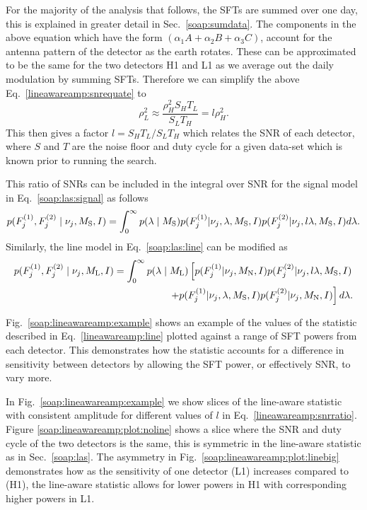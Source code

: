 For the majority of the analysis that follows, the \glspl{SFT} are summed over one day, this is explained in greater detail in Sec.~\ref{soap:sumdata}. 
The components in the above equation which have the form $(\alpha_1A +
\alpha_2B + \alpha_3C)$, account for the antenna pattern of the detector as the earth rotates.
These can be approximated to be the same for the two detectors H1 and L1 as we average out the daily modulation by summing \glspl{SFT}.
Therefore we can simplify the above Eq.~\ref{lineawareamp:snrequate} to
\begin{equation}
\label{lineawareamp:snrratio}
    \rho_L^2 \approx \frac{\rho_H^2 S_H T_L}{S_L T_H} = l \rho_H^2 .
\end{equation}
This then gives a factor $l = S_H T_L/S_L T_H$ which relates the \gls{SNR} of each detector, where $S$ and $T$ are the noise floor and duty cycle for a given data-set which is known prior to running the search.

This ratio of \glspl{SNR} can be included in the integral over \gls{SNR} for the signal model in Eq.~\ref{soap:las:signal} as follows
\begin{equation}
\label{lineawareamp:signal}
p(F^{(1)}_{j},F^{(2)}_{j} \mid \nu_j,M_{\rm{S}},I) = \int_0^{\infty}  p(\lambda \mid M_{\rm{S}}) 
p(F^{(1)}_{j}|\nu_j,\lambda,M_{\text{S}},I)p(F^{(2)}_{j}|\nu_j,l\lambda,M_{\text{S}},I) d\lambda.
\end{equation}
Similarly, the line model in Eq.~\ref{soap:las:line} can be modified as
\begin{equation}
\label{lineawareamp:line}
\begin{split}
p(F^{(1)}_{j},F^{(2)}_{j} \mid \nu_j,M_{\rm{L}},I) = \int_0^{\infty}  p(\lambda \mid M_{\rm{L}}) 
\left[ p(F^{(1)}_{j}|\nu_j,M_{\rm{N}},I)p(F^{(2)}_{j}|\nu_j,l\lambda,M_{\rm{S}},I) \right. \\
\left. + p(F^{(1)}_{j}|\nu_j,\lambda,M_{\rm{S}},I)p(F^{(2)}_{j}|\nu_j,M_{\rm{N}},I)\right]d\lambda .
\end{split}
\end{equation}

Fig.~\ref{soap:lineawareamp:example} shows an example of the values of the
statistic described in Eq.~\ref{lineawareamp:line} plotted against a range of
\gls{SFT} powers from each detector. This demonstrates how the statistic
accounts for a difference in sensitivity between detectors by allowing the \gls{SFT}
power, or effectively \gls{SNR}, to vary more.

In Fig.~\ref{soap:lineawareamp:example} we show slices of the line-aware statistic with consistent amplitude for different values of $l$ in Eq.~\ref{lineawareamp:snrratio}. 
Figure \ref{soap:lineawareamp:plot:noline} shows a slice where the \gls{SNR} and duty cycle of the two detectors is the same, this is symmetric in the line-aware statistic as in Sec.~\ref{soap:las}.
The asymmetry in Fig.~\ref{soap:lineawareamp:plot:linebig} demonstrates how as the sensitivity of one detector (L1) increases compared to (H1), the line-aware statistic allows for lower powers in H1 with corresponding higher powers in L1.


